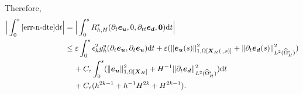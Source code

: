 \documentclass[11pt,reqno]{amsart}
\theoremstyle{definition}
\theoremstyle{plain}
\numberwithin{theorem}{section}
\numberwithin{proposition}{section}
\numberwithin{lemma}{section}
\numberwithin{equation}{section}
\newcommand{\bs}[1]{\boldsymbol{#1}}
\def\d{\mathrm{d}}
\renewcommand{\(}{\bigl(}
\renewcommand{\)}{\bigr)}
\begin{document}
Therefore, 
\begin{align}\label{dte-estimates-most}
\Big| \int_0^s \eqref{err-n-dte} \d t \Big| 
&= \Big| \int_0^s R_{h,H}^*(\partial_t{\bs e}_{\bs u}, 0, \partial_{tt}{\bs e}_{\bs d}, \bs 0) \d t \Big| \notag\\
&\leq
\varepsilon \int_0^s \epsilon_h^2
g_h^{\rm u}(\partial_t{\bs e}_{\bs u},\partial_t{\bs e}_{\bs u}) \d t 
+ \varepsilon 
(\|{\bs e}_{\bs u}(s)\|_{1,\Omega[{\bs X}_H(\cdot,s)]}^2 
+\|\partial_t{\bs e}_{\bs d}(s)\|_{L^2(\widehat\Omega^{\rm s}_H)}^2) \notag\\
&\quad\, 
+ C_\varepsilon\int_0^s
(\|{\bs e}_{\bs u}\|_{1,\Omega[{\bs X}_H]}^2 
+H^{-1}\|\partial_t{\bs e}_{\bs d}\|_{L^2(\widehat\Omega^{\rm s}_H)}^2)\d t \notag\\
&\quad\, + C_\varepsilon (h^{2k-1} + h^{-1}H^{2k} + H^{2k-1}) . 
\end{align}
\end{document}
